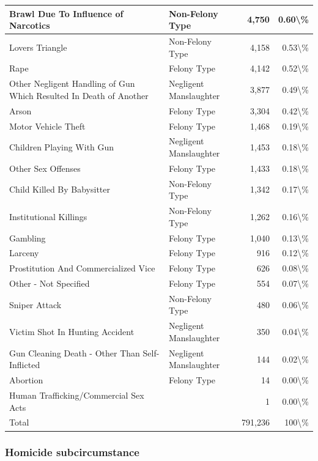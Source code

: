\documentclass[
]{krantz}
\begin{document}
\begin{longtable}[t]{l|l|r|r}
\hline
Brawl Due To Influence of Narcotics & Non-Felony Type & 4,750 & 0.60\textbackslash{}\%\\
\hline
Lovers Triangle & Non-Felony Type & 4,158 & 0.53\textbackslash{}\%\\
\hline
Rape & Felony Type & 4,142 & 0.52\textbackslash{}\%\\
\hline
Other Negligent Handling of Gun Which Resulted In Death of Another & Negligent Manslaughter & 3,877 & 0.49\textbackslash{}\%\\
\hline
Arson & Felony Type & 3,304 & 0.42\textbackslash{}\%\\
\hline
Motor Vehicle Theft & Felony Type & 1,468 & 0.19\textbackslash{}\%\\
\hline
Children Playing With Gun & Negligent Manslaughter & 1,453 & 0.18\textbackslash{}\%\\
\hline
Other Sex Offenses & Felony Type & 1,433 & 0.18\textbackslash{}\%\\
\hline
Child Killed By Babysitter & Non-Felony Type & 1,342 & 0.17\textbackslash{}\%\\
\hline
Institutional Killings & Non-Felony Type & 1,262 & 0.16\textbackslash{}\%\\
\hline
Gambling & Felony Type & 1,040 & 0.13\textbackslash{}\%\\
\hline
Larceny & Felony Type & 916 & 0.12\textbackslash{}\%\\
\hline
Prostitution And Commercialized Vice & Felony Type & 626 & 0.08\textbackslash{}\%\\
\hline
Other - Not Specified & Felony Type & 554 & 0.07\textbackslash{}\%\\
\hline
Sniper Attack & Non-Felony Type & 480 & 0.06\textbackslash{}\%\\
\hline
Victim Shot In Hunting Accident & Negligent Manslaughter & 350 & 0.04\textbackslash{}\%\\
\hline
Gun Cleaning Death - Other Than Self-Inflicted & Negligent Manslaughter & 144 & 0.02\textbackslash{}\%\\
\hline
Abortion & Felony Type & 14 & 0.00\textbackslash{}\%\\
\hline
Human Trafficking/Commercial Sex Acts &  & 1 & 0.00\textbackslash{}\%\\
\hline
Total &  & 791,236 & 100\textbackslash{}\%\\
\hline
\end{longtable}

\subsubsection{Homicide
subcircumstance}\label{homicide-subcircumstance}
\end{document}
